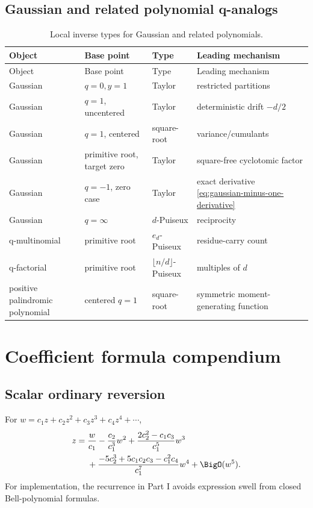 \documentclass[11pt,letterpaper,oneside,openany]{book}
\theoremstyle{definition}
\theoremstyle{remark}
\begin{document}
\section{Gaussian and related polynomial q-analogs}
\begin{longtable}{@{}p{}p{}p{}p{}@{}}
\caption{Local inverse types for Gaussian and related polynomials.}\label{tab:g-atlas}\\
\toprule
Object & Base point & Type & Leading mechanism \\
\midrule
\endfirsthead
\toprule
Object & Base point & Type & Leading mechanism \\
\midrule
\endhead
Gaussian & \(q=0,y=1\) & Taylor & restricted partitions \\
Gaussian & \(q=1\), uncentered & Taylor & deterministic drift \(-d/2\) \\
Gaussian & \(q=1\), centered & square-root & variance/cumulants \\
Gaussian & primitive root, target zero & Taylor & square-free cyclotomic factor \\
Gaussian & \(q=-1\), zero case & Taylor & exact derivative
\cref{eq:gaussian-minus-one-derivative} \\
Gaussian & \(q=\infty\) & \(d\)-Puiseux & reciprocity \\
q-multinomial & primitive root & \(e_d\)-Puiseux & residue-carry count \\
q-factorial & primitive root & \(\lfloor n/d\rfloor\)-Puiseux & multiples of
\(d\) \\
positive palindromic polynomial & centered \(q=1\) & square-root & symmetric
moment-generating function \\
\bottomrule
\end{longtable}

\chapter{Coefficient formula compendium}

\section{Scalar ordinary reversion}
For \(w=c_1z+c_2z^2+c_3z^3+c_4z^4+\cdots\),
\begin{align*}
 z={}&\frac{w}{c_1}-\frac{c_2}{c_1^3}w^2
 +\frac{2c_2^2-c_1c_3}{c_1^5}w^3 \\
 &+\frac{-5c_2^3+5c_1c_2c_3-c_1^2c_4}{c_1^7}w^4
 +\BigO(w^5).
\end{align*}
For implementation, the recurrence in Part I avoids expression swell from
closed Bell-polynomial formulas.
\end{document}
